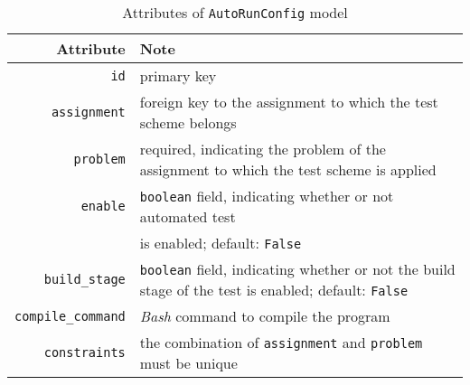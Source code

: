 \begin{table}[H]
    \centering
    \caption{Attributes of \texttt{AutoRunConfig} model}
    \label{tab:AUTO_ATTR}
    \renewcommand{\arraystretch}{1}
    \begin{tabular}[ht]{r|p{4in}}
        \hline
        Attribute & Note \\
        \hline
        \hline

        \texttt{id} & primary key \\
        \hline
        \texttt{assignment} & foreign key to the assignment to which the test
            scheme belongs \\
        \hline
        \hline

        \texttt{problem} & required, indicating the problem of the assignment to
            which the test scheme is applied \\
        \hline
        \texttt{enable} & \texttt{boolean} field, indicating whether or not automated test \\
            & is enabled; default: \texttt{False} \\
        \hline
        \texttt{build\_stage} & \texttt{boolean} field, indicating whether or
            not the build stage of the test is enabled;
            default: \texttt{False} \\
        \hline
        \texttt{compile\_command} & \emph{Bash} command to compile the program \\
        \hline
        \hline

        \texttt{constraints} & the combination of \texttt{assignment} and
            \texttt{problem} must be unique \\
        \hline
    \end{tabular}
    \renewcommand{\arraystretch}{1}
\end{table}

